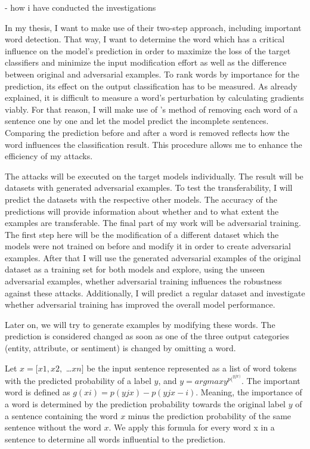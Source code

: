 - how i have conducted the investigations



In my thesis, I want to make use of their two-step approach, including important word detection. That way, I want to determine the word which has a critical influence on the model's prediction in order to maximize the loss of the target classifiers and minimize the input modification effort as well as the difference between original and adversarial examples. 
To rank words by importance for the prediction, its effect on the output classification has to be measured. As already explained, it is difficult to measure a word's perturbation by calculating gradients viably. 
For that reason, I will make use of \cite{jin2019bert}'s method of removing each word of a sentence one by one and let the model predict the incomplete sentences. 
 Comparing the prediction before and after a word is removed reflects how the word influences the classification result. This procedure allows me to enhance the efficiency of my attacks.





The attacks will be executed on the target models individually.
The result will be datasets with generated adversarial examples. To test the transferability, I will predict the datasets with the respective other models. The accuracy of the predictions will provide information about whether and to what extent the examples are transferable.
The final part of my work will be adversarial training. 
The first step here will be the modification of a different dataset which the models were not trained on before and modify it in order to create adversarial examples. After that I will use the generated adversarial examples of the original dataset as a training set for both models and explore, using the unseen adversarial examples, whether adversarial training influences the robustness against these attacks. Additionally, I will predict a regular dataset and investigate whether adversarial training has improved the overall model performance.


Later on, we will try to generate examples by modifying these words.
The prediction is considered changed as soon as one of the three output categories (entity, attribute, or sentiment) is changed by omitting a word.

Let ${x = [x1, x2,}$ \dots${xn]}$ be the input sentence represented as a list of word tokens with the predicted probability of a label $y$, and ${y = argmaxy}^{p(}^{yjx)}$. The important word is defined as ${g(xi) = p(yjx) - p(yjx−i)}$.
Meaning, the importance of a word is determined by the prediction probability towards the original label $y$ of a sentence containing the word $x$ minus the prediction probability of the same sentence without the word $x$.
We apply this formula for every word x in a sentence to determine all words influential to the prediction. 

